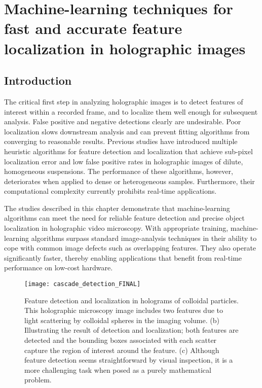 \chapter{Machine-learning techniques for fast and accurate feature localization in holographic images}
\label{ch:cascade}

\section{Introduction}

The critical first step in analyzing holographic images 
is to detect features of interest within a recorded frame,
and to localize them well enough for subsequent analysis\cite{cheong09}.
False positive and negative detections clearly are undesirable.
Poor localization slows downstream analysis
\cite{yevick14} and can prevent fitting algorithms 
from converging to reasonable results. Previous studies
have introduced multiple heuristic algorithms for feature detection and
localization that achieve
sub-pixel localization error and low false positive rates in
holographic images of dilute, homogeneous suspensions.\cite{crocker96,cheong09,krishnatreya14a}
The performance of these algorithms, however, deteriorates when applied
to dense or heterogeneous samples. Furthermore, their computational
complexity currently prohibits real-time applications.

The studies described in this chapter demonstrate that machine-learning
algorithms can meet the
need for reliable feature detection and precise object localization in
holographic video microscopy. With appropriate training,
machine-learning algorithms surpass standard image-analysis
techniques in their ability to cope with common image defects
such as overlapping features.
They also operate significantly faster, thereby enabling
applications that benefit from real-time performance on low-cost
hardware.

\begin{figure}[b!]
  \centering
  \texttt{[image: cascade\_detection\_FINAL]}	
  \caption{ Feature detection and localization in holograms of colloidal particles.
    This holographic microscopy image includes two features due to light scattering by
    colloidal spheres in the imaging volume. (b) Illustrating the result of detection
    and localization; both features are detected and the bounding boxes associated with
    each scatter capture the region of interest around the feature. (c) Although feature
    detection seems straightforward by visual inspection, it is a more challenging
  task when posed as a purely mathematical problem.} 
  \label{fig:detection}
\end{figure}

